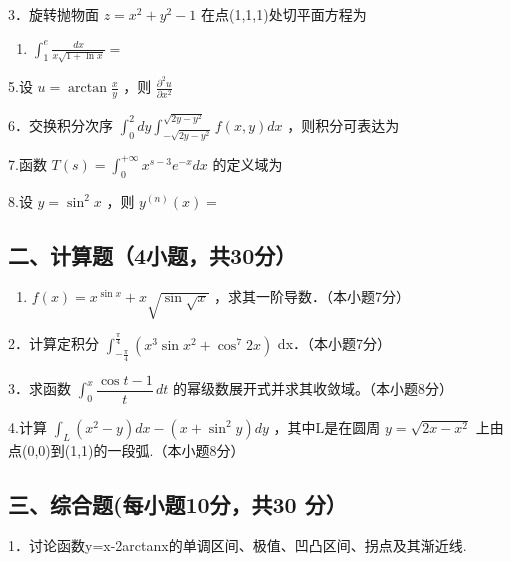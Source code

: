 \documentclass[11pt,fontset=fandol]{ctexart}
\providecommand{\tightlist}{\setlength{\itemsep}{0pt}\setlength{\parskip}{0pt}}
\begin{document}
3．旋转抛物面 \(z = x ^ { 2 } + y ^ { 2 } - 1\)
在点(1,1,1)处切平面方程为

\begin{enumerate}
\def\labelenumi{\arabic{enumi}.}
\setcounter{enumi}{3}
\tightlist
\item
  \(\int _ { 1 } ^ { e } { \frac { d x } { x { \sqrt { 1 + \ln x } } } } =\)
\end{enumerate}

5.设 \(u = \arctan { \frac { x } { y } }\) ，则
\(\frac { { \partial } ^ { 2 } u } { { \partial } x ^ { 2 } }\)

6．交换积分次序
\(\int _ { 0 } ^ { 2 } d y \int _ { - \sqrt { 2 y - y ^ { 2 } } } ^ { \sqrt { 2 y - y ^ { 2 } } } f ( x , y ) d x\)
，则积分可表达为

7.函数
\(T ( s ) = \int _ { 0 } ^ { + \infty } x ^ { s - 3 } e ^ { - x } d x\)
的定义域为

8.设 \(y = \sin ^ { 2 } x\) ，则 \(y ^ { ( n ) } ( x ) =\)

\subsection{二、计算题（4小题，共30分）}\label{ux4e8cux8ba1ux7b97ux98984ux5c0fux9898ux517130ux5206}

\begin{enumerate}
\def\labelenumi{\arabic{enumi}.}
\tightlist
\item
  \(f ( x ) = x ^ { \sin x } + x { \sqrt { \sin { \sqrt { x } } } }\)
  ，求其一阶导数．（本小题7分）
\end{enumerate}

2．计算定积分
\(\int _ { - { \frac { \pi } { 4 } } } ^ { \frac { \pi } { 4 } } ( x ^ { 3 } \sin x ^ { 2 } + \cos ^ { 7 } 2 x )\)
dx．（本小题7分）

3．求函数 \(\int_0^x\dfrac{\cos t-1}{t}\,dt\)
的幂级数展开式并求其收敛域。（本小题8分）

4.计算
\(\int _ { L } ( x ^ { 2 } - y ) d x - ( x + \sin ^ { 2 } y ) d y\)
，其中L是在圆周 \(y = \sqrt { 2 x - x ^ { 2 } }\)
上由点(0,0)到(1,1)的一段弧.（本小题8分）

\subsection{三、综合题(每小题10分，共30
分）}\label{ux4e09ux7efcux5408ux9898ux6bcfux5c0fux989810ux5206ux517130-ux5206}

1．讨论函数y=x-2arctanx的单调区间、极值、凹凸区间、拐点及其渐近线.
\end{document}
